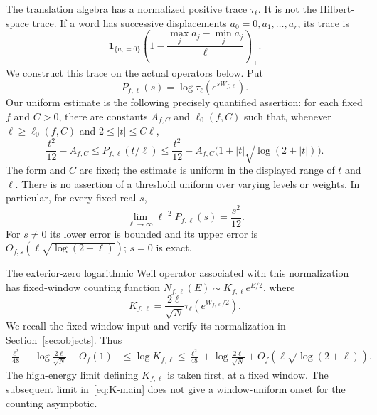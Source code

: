 \documentclass[11pt,reqno]{amsart}
\numberwithin{equation}{section}
\newcommand{\one}{\mathbf 1}
\newcommand{\abs}[1]{\lvert#1\rvert}
\begin{document}
The translation algebra has a normalized positive trace $\tau_\ell$.
It is not the Hilbert-space trace. If a word has successive
displacements $a_0=0,a_1,\ldots,a_r$, its trace is
\begin{equation}\label{eq:word-intro}
 \one_{\{a_r=0\}}
 \left(1-\frac{\max_j a_j-\min_j a_j}{\ell}\right)_+.
\end{equation}
We construct this trace on the actual operators below. Put
\[
 P_{f,\ell}(s)=\log\tau_\ell(e^{sW_{f,\ell}}).
\]
Our uniform estimate is the following precisely quantified assertion:
for each fixed $f$ and $C>0$, there are constants $A_{f,C}$ and
$\ell_0(f,C)$ such that, whenever $\ell\ge\ell_0(f,C)$ and
$2\le\abs t\le C\ell$,
\begin{equation}\label{eq:uniform-main}
 \frac{t^2}{12}-A_{f,C}
 \le P_{f,\ell}(t/\ell)
 \le\frac{t^2}{12}
        +A_{f,C}\bigl(1+\abs t\sqrt{\log(2+\abs t)}\bigr).
\end{equation}
The form and $C$ are fixed; the estimate is uniform in the displayed
range of $t$ and $\ell$. There is no assertion of a threshold uniform
over varying levels or weights. In particular, for every fixed real $s$,
\begin{equation}\label{eq:pressure-main}
 \lim_{\ell\to\infty}\ell^{-2}P_{f,\ell}(s)=\frac{s^2}{12}.
\end{equation}
For $s\ne0$ its lower error is bounded and its upper error is
$O_{f,s}(\ell\sqrt{\log(2+\ell)})$; $s=0$ is exact.

The exterior-zero logarithmic Weil operator associated with this
normalization has fixed-window counting function
$N_{f,\ell}(E)\sim K_{f,\ell}e^{E/2}$, where
\begin{equation}\label{eq:K-intro}
 K_{f,\ell}=\frac{2\ell}{\sqrt N}\tau_\ell(e^{W_{f,\ell}/2}).
\end{equation}
We recall the fixed-window input and verify its normalization in
Section~\ref{sec:objects}. Thus
\begin{equation}\label{eq:K-main}
 \begin{split}
 \frac{\ell^2}{48}+\log\frac{2\ell}{\sqrt N}-O_f(1)
 &\le\log K_{f,\ell}\le
 \frac{\ell^2}{48}+\log\frac{2\ell}{\sqrt N}
       +O_f(\ell\sqrt{\log(2+\ell)}).
 \end{split}
\end{equation}
The high-energy limit defining $K_{f,\ell}$ is taken first, at a
fixed window. The subsequent limit in~\eqref{eq:K-main} does not
give a window-uniform onset for the counting asymptotic.
\end{document}
